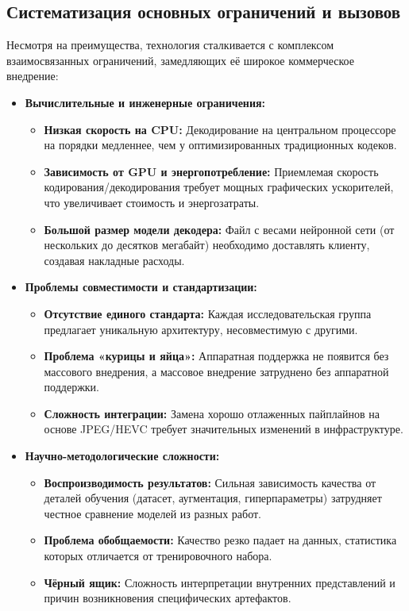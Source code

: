\subsection{Систематизация основных ограничений и вызовов}
Несмотря на преимущества, технология сталкивается с комплексом взаимосвязанных ограничений, замедляющих её широкое коммерческое внедрение:

\begin{itemize}
\item \textbf{Вычислительные и инженерные ограничения:}
\begin{itemize}
\item \textbf{Низкая скорость на CPU:} Декодирование на центральном процессоре на порядки медленнее, чем у оптимизированных традиционных кодеков.
\item \textbf{Зависимость от GPU и энергопотребление:} Приемлемая скорость кодирования/декодирования требует мощных графических ускорителей, что увеличивает стоимость и энергозатраты.
\item \textbf{Большой размер модели декодера:} Файл с весами нейронной сети (от нескольких до десятков мегабайт) необходимо доставлять клиенту, создавая накладные расходы.
\end{itemize}
\item \textbf{Проблемы совместимости и стандартизации:}
\begin{itemize}
\item \textbf{Отсутствие единого стандарта:} Каждая исследовательская группа предлагает уникальную архитектуру, несовместимую с другими.
\item \textbf{Проблема «курицы и яйца»:} Аппаратная поддержка не появится без массового внедрения, а массовое внедрение затруднено без аппаратной поддержки.
\item \textbf{Сложность интеграции:} Замена хорошо отлаженных пайплайнов на основе JPEG/HEVC требует значительных изменений в инфраструктуре.
\end{itemize}
\item \textbf{Научно-методологические сложности:}
\begin{itemize}
\item \textbf{Воспроизводимость результатов:} Сильная зависимость качества от деталей обучения (датасет, аугментация, гиперпараметры) затрудняет честное сравнение моделей из разных работ.
\item \textbf{Проблема обобщаемости:} Качество резко падает на данных, статистика которых отличается от тренировочного набора.
\item \textbf{Чёрный ящик:} Сложность интерпретации внутренних представлений и причин возникновения специфических артефактов.
\end{itemize}
\end{itemize}

